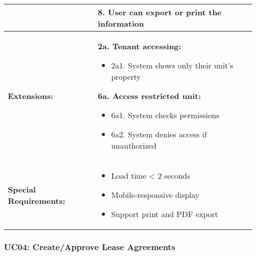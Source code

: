 \documentclass[12pt]{article}
\begin{document}
\begin{longtable}{|p{3cm}|p{11cm}|}
& 8. User can export or print the information \\
\hline
\textbf{Extensions:} & 
\textbf{2a. Tenant accessing:}
\begin{itemize}
    \item 2a1. System shows only their unit's property
\end{itemize}
\textbf{6a. Access restricted unit:}
\begin{itemize}
    \item 6a1. System checks permissions
    \item 6a2. System denies access if unauthorized
\end{itemize} \\
\hline
\textbf{Special Requirements:} & 
\begin{itemize}
    \item Load time < 2 seconds
    \item Mobile-responsive display
    \item Support print and PDF export
\end{itemize} \\
\hline
\end{longtable}

\subsubsection{UC04: Create/Approve Lease Agreements}
\end{document}
